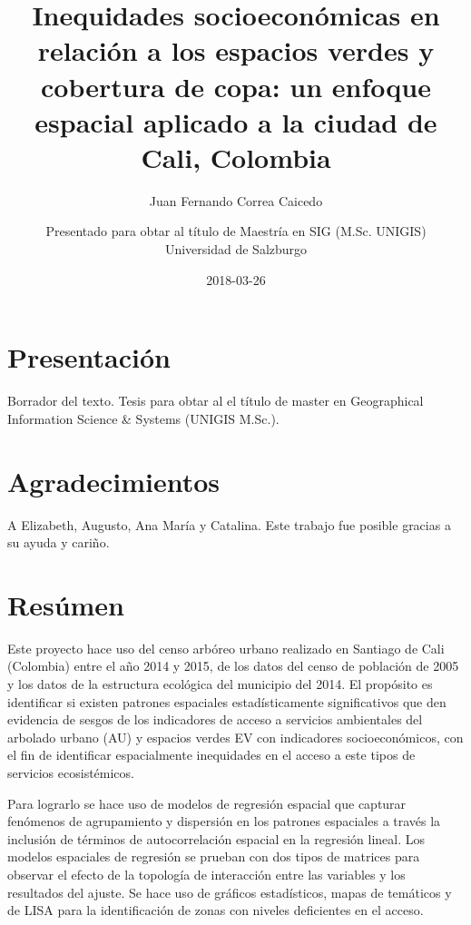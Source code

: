 \documentclass[12pt,]{book}
\title{Inequidades socioeconómicas en relación a los espacios verdes y
cobertura de copa: un enfoque espacial aplicado a la ciudad de Cali,
Colombia}
\subtitle{Juan Fernando Correa Caicedo}
\author{Presentado para obtar al título de Maestría en SIG (M.Sc. UNIGIS) \\ Universidad de Salzburgo}
\date{2018-03-26}
\begin{document}
\maketitle

{
\setcounter{tocdepth}{2}
\tableofcontents
}
\listoftables
\listoffigures
\chapter*{Presentación}\label{presentacion}

Borrador del texto. Tesis para obtar al el título de master en
Geographical Information Science \& Systems (UNIGIS M.Sc.).

\chapter*{Agradecimientos}\label{agradecimientos}

A Elizabeth, Augusto, Ana María y Catalina. Este trabajo fue posible
gracias a su ayuda y cariño.

\chapter*{Resúmen}\label{resumen}

Este proyecto hace uso del censo arbóreo urbano realizado en Santiago de
Cali (Colombia) entre el año 2014 y 2015, de los datos del censo de
población de 2005 y los datos de la estructura ecológica del municipio
del 2014. El propósito es identificar si existen patrones espaciales
estadísticamente significativos que den evidencia de sesgos de los
indicadores de acceso a servicios ambientales del arbolado urbano (AU) y
espacios verdes EV con indicadores socioeconómicos, con el fin de
identificar espacialmente inequidades en el acceso a este tipos de
servicios ecosistémicos.

Para lograrlo se hace uso de modelos de regresión espacial que capturar
fenómenos de agrupamiento y dispersión en los patrones espaciales a
través la inclusión de términos de autocorrelación espacial en la
regresión lineal. Los modelos espaciales de regresión se prueban con dos
tipos de matrices para observar el efecto de la topología de interacción
entre las variables y los resultados del ajuste. Se hace uso de gráficos
estadísticos, mapas de temáticos y de LISA para la identificación de
zonas con niveles deficientes en el acceso.
\end{document}
